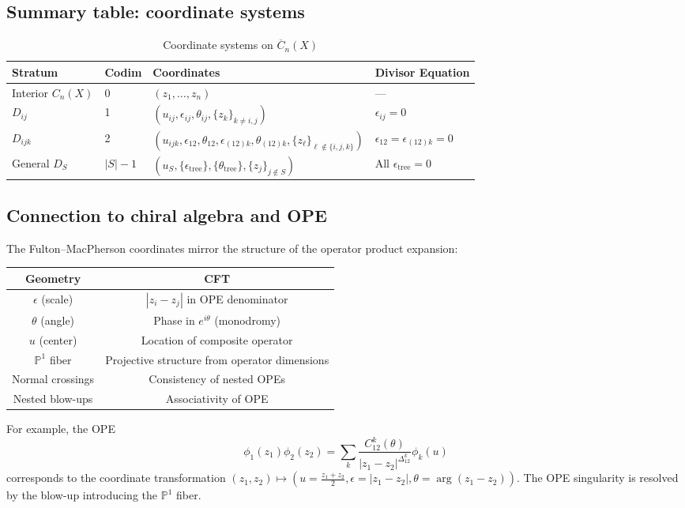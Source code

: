 \subsection{Summary table: coordinate systems}

\begin{table}[ht]
\centering
\caption{Coordinate systems on $\overline{C}_n(X)$}
\label{tab:coordinate-summary}
\begin{tabular}{|l|l|l|l|}
\hline
\textbf{Stratum} & \textbf{Codim} & \textbf{Coordinates} & \textbf{Divisor Equation} \\
\hline
Interior $C_n(X)$ & 0 & $(z_1, \ldots, z_n)$ & --- \\
\hline
$D_{ij}$ & 1 & $(u_{ij}, \epsilon_{ij}, \theta_{ij}, \{z_k\}_{k \neq i,j})$ & $\epsilon_{ij} = 0$ \\
\hline
$D_{ijk}$ & 2 & $(u_{ijk}, \epsilon_{12}, \theta_{12}, \epsilon_{(12)k}, \theta_{(12)k}, \{z_\ell\}_{\ell \notin \{i,j,k\}})$ & $\epsilon_{12} = \epsilon_{(12)k} = 0$ \\
\hline
General $D_S$ & $|S|-1$ & $(u_S, \{\epsilon_{\text{tree}}\}, \{\theta_{\text{tree}}\}, \{z_j\}_{j \notin S})$ & All $\epsilon_{\text{tree}} = 0$ \\
\hline
\end{tabular}
\end{table}

\subsection{Connection to chiral algebra and OPE}

\begin{remark}\label{persp:coordinates-ope}
The Fulton--MacPherson coordinates mirror the structure of the operator
product expansion:

\begin{center}
\begin{tabular}{c|c}
Geometry & CFT \\
\hline
$\epsilon$ (scale) & $|z_i - z_j|$ in OPE denominator \\
$\theta$ (angle) & Phase in $e^{i\theta}$ (monodromy) \\
$u$ (center) & Location of composite operator \\
$\mathbb{P}^1$ fiber & Projective structure from operator dimensions \\
Normal crossings & Consistency of nested OPEs \\
Nested blow-ups & Associativity of OPE
\end{tabular}
\end{center}

For example, the OPE
\[\phi_1(z_1)\phi_2(z_2) = \sum_k \frac{C_{12}^k(\theta)}{|z_1-z_2|^{\Delta_{12}^k}} \phi_k(u)\]
corresponds to the coordinate transformation
$(z_1, z_2) \mapsto (u = \frac{z_1+z_2}{2}, \epsilon = |z_1-z_2|, \theta = \arg(z_1-z_2))$.
The OPE singularity is resolved by the blow-up introducing the $\mathbb{P}^1$ fiber.
\end{remark}

